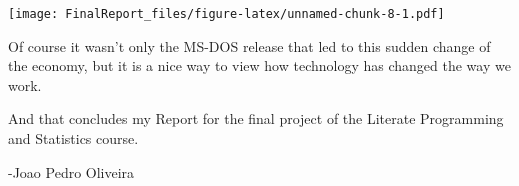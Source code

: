 \documentclass[]{article}
\begin{document}
\texttt{[image: FinalReport\_files/figure-latex/unnamed-chunk-8-1.pdf]}

Of course it wasn't only the MS-DOS release that led to this sudden
change of the economy, but it is a nice way to view how technology has
changed the way we work.

And that concludes my Report for the final project of the Literate
Programming and Statistics course.

-Joao Pedro Oliveira
\end{document}
